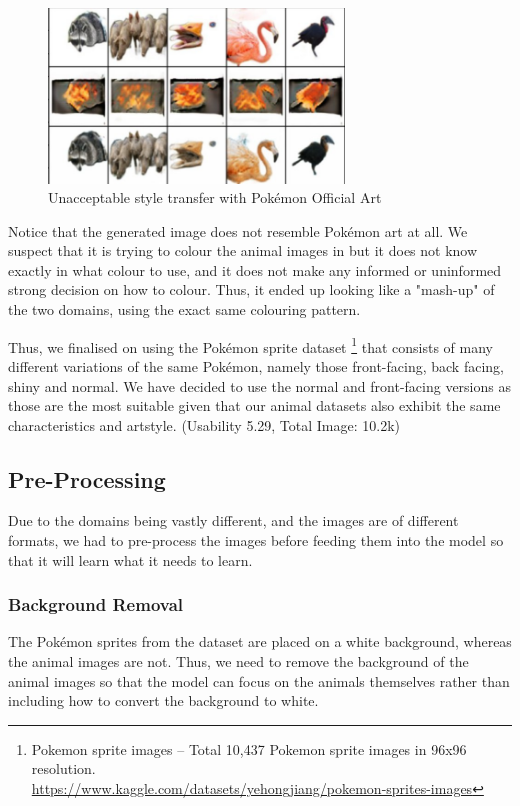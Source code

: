 \documentclass[twoside,english,notitlepage]{report}
\begin{document}
\begin{figure}[h]
    \centering
    \includegraphics[width=0.7\textwidth]{task2/poke-fail1.jpg}
    \vspace{-10pt}
    \caption{Unacceptable style transfer with Pokémon Official Art}\label{fig:poke-fail1}
\end{figure}

\noindent Notice that the generated image does not resemble Pokémon art at all. We suspect that it is trying to colour the animal images in but it does not know exactly in what colour to use, and it does not make any informed or uninformed strong decision on how to colour. Thus, it ended up looking like a "mash-up" of the two domains, using the exact same colouring pattern. 

\noindent Thus, we finalised on using the Pokémon sprite dataset \footnote{Pokemon sprite images – Total 10,437 Pokemon sprite images in 96x96 resolution. \\ \href{https://www.kaggle.com/datasets/yehongjiang/pokemon-sprites-images}{https://www.kaggle.com/datasets/yehongjiang/pokemon-sprites-images}} that consists of many different variations of the same Pokémon, namely those front-facing, back facing, shiny and normal. We have decided to use the normal and front-facing versions as those are the most suitable given that our animal datasets also exhibit the same characteristics and artstyle. (Usability 5.29, Total Image: 10.2k)

\subsection{Pre-Processing}\label{task2:preprocess}
Due to the domains being vastly different, and the images are of different formats, we had to pre-process the images before feeding them into the model so that it will learn what it needs to learn. 
\subsubsection{Background Removal}
The Pokémon sprites from the dataset are placed on a white background, whereas the animal images are not. Thus, we need to remove the background of the animal images so that the model can focus on the animals themselves rather than including how to convert the background to white. \\
\end{document}
